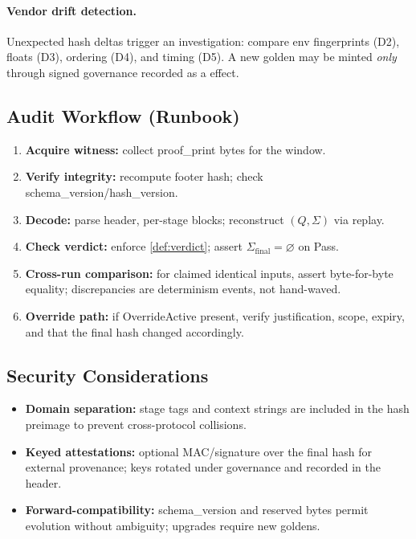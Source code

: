 \documentclass[11pt]{article}
\theoremstyle{plain}
\theoremstyle{definition}
\theoremstyle{remark}
\def\Q{Q}%
\def\Sig{\Sigma}%
\def\code#1{#1}%
\DeclareRobustCommand{\Q}{\texorpdfstring{\ensuremath{\mathcal{Q}}}{Q}}     %
\DeclareRobustCommand{\Sig}{\texorpdfstring{\ensuremath{\Sigma}}{\Sigma}}   %
\newcommand{\code}[1]{\texttt{\textup{#1}}}    %
\def\Q{Q}%
\def\Sig{\Sigma}%
\def\code#1{#1}%
\begin{document}
\paragraph{Vendor drift detection.} Unexpected hash deltas trigger an investigation: compare env fingerprints (D2), floats (D3), ordering (D4), and timing (D5). A new golden may be minted \emph{only} through signed governance recorded as a \Sig{} effect.

\subsection{Audit Workflow (Runbook)}
\begin{enumerate}[leftmargin=2em,label=(A\arabic*)]
  \item \textbf{Acquire witness:} collect \code{proof\_print} bytes for the window.
  \item \textbf{Verify integrity:} recompute footer hash; check \code{schema\_version}/\code{hash\_version}.
  \item \textbf{Decode:} parse header, per-stage blocks; reconstruct $(\Q,\Sig)$ via replay.
  \item \textbf{Check verdict:} enforce \cref{def:verdict}; assert $\Sigma_{\mathrm{final}}=\varnothing$ on Pass.
  \item \textbf{Cross-run comparison:} for claimed identical inputs, assert byte-for-byte equality; discrepancies are determinism events, not hand-waved.
  \item \textbf{Override path:} if \code{OverrideActive} present, verify justification, scope, expiry, and that the final hash changed accordingly.
\end{enumerate}

\subsection{Security Considerations}
\begin{itemize}[leftmargin=1.6em]
  \item \textbf{Domain separation:} stage tags and context strings are included in the hash preimage to prevent cross-protocol collisions.
  \item \textbf{Keyed attestations:} optional MAC/signature over the final hash for external provenance; keys rotated under governance and recorded in the header.
  \item \textbf{Forward-compatibility:} \code{schema\_version} and reserved bytes permit evolution without ambiguity; upgrades require new goldens.
\end{itemize}
\end{document}

